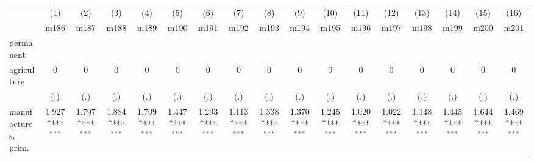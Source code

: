 {
\def\sym#1{\ifmmode^{#1}\else\(^{#1}\)\fi}
\begin{tabular}{l*{16}{c}}
\hline\hline
                    &\multicolumn{1}{c}{(1)}&\multicolumn{1}{c}{(2)}&\multicolumn{1}{c}{(3)}&\multicolumn{1}{c}{(4)}&\multicolumn{1}{c}{(5)}&\multicolumn{1}{c}{(6)}&\multicolumn{1}{c}{(7)}&\multicolumn{1}{c}{(8)}&\multicolumn{1}{c}{(9)}&\multicolumn{1}{c}{(10)}&\multicolumn{1}{c}{(11)}&\multicolumn{1}{c}{(12)}&\multicolumn{1}{c}{(13)}&\multicolumn{1}{c}{(14)}&\multicolumn{1}{c}{(15)}&\multicolumn{1}{c}{(16)}\\
                    &\multicolumn{1}{c}{m186}&\multicolumn{1}{c}{m187}&\multicolumn{1}{c}{m188}&\multicolumn{1}{c}{m189}&\multicolumn{1}{c}{m190}&\multicolumn{1}{c}{m191}&\multicolumn{1}{c}{m192}&\multicolumn{1}{c}{m193}&\multicolumn{1}{c}{m194}&\multicolumn{1}{c}{m195}&\multicolumn{1}{c}{m196}&\multicolumn{1}{c}{m197}&\multicolumn{1}{c}{m198}&\multicolumn{1}{c}{m199}&\multicolumn{1}{c}{m200}&\multicolumn{1}{c}{m201}\\
\hline
permanent           &                     &                     &                     &                     &                     &                     &                     &                     &                     &                     &                     &                     &                     &                     &                     &                     \\
agriculture         &           0         &           0         &           0         &           0         &           0         &           0         &           0         &           0         &           0         &           0         &           0         &           0         &           0         &           0         &           0         &           0         \\
                    &         (.)         &         (.)         &         (.)         &         (.)         &         (.)         &         (.)         &         (.)         &         (.)         &         (.)         &         (.)         &         (.)         &         (.)         &         (.)         &         (.)         &         (.)         &         (.)         \\
[1em]
manufactures, prim. &       1.927\sym{***}&       1.797\sym{***}&       1.884\sym{***}&       1.709\sym{***}&       1.447\sym{***}&       1.293\sym{***}&       1.113\sym{***}&       1.338\sym{***}&       1.370\sym{***}&       1.245\sym{***}&       1.020\sym{***}&       1.022\sym{***}&       1.148\sym{***}&       1.445\sym{***}&       1.644\sym{***}&       1.469\sym{***}\\

\end{tabular}}
